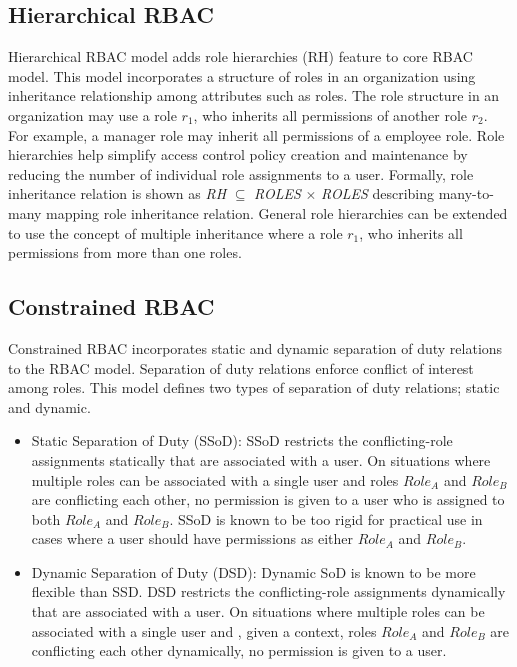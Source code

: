 \subsection{Hierarchical RBAC} 

Hierarchical RBAC model adds role hierarchies (RH) feature to core RBAC model.
This model incorporates a structure of roles in an organization using inheritance relationship among attributes such as roles.
The role structure in an organization may use
a role $r_1$, who inherits all permissions of another role $r_2$.
For example, a manager role may inherit all permissions of a employee role.
Role hierarchies help simplify access control policy creation and maintenance by reducing the number of
individual role assignments to a user. Formally, role inheritance relation is shown as \textit{RH} $\subseteq$ \textit{ROLES} $\times$ \textit{ROLES} describing many-to-many mapping role inheritance relation. 
General role hierarchies can be extended to use the concept of multiple inheritance where
a role $r_1$, who inherits all permissions from more than one roles.


\subsection{Constrained RBAC}

Constrained RBAC incorporates static and dynamic separation of duty relations to the RBAC model. Separation of 
duty relations enforce conflict of interest among roles. This model defines two types of separation of duty relations; static and dynamic.

\begin{itemize}
	\item Static Separation of Duty (SSoD): SSoD restricts the conflicting-role assignments statically that are associated with a user. On situations
	where multiple roles can be associated with a single user and roles $Role_A$ and $Role_B$ are conflicting each other, no permission is given to a user who is assigned to both $Role_A$ and $Role_B$. SSoD is known to be too rigid for practical use in cases where a user should have permissions as either $Role_A$ and $Role_B$.
	\item Dynamic Separation of Duty (DSD): Dynamic SoD is known to be
more flexible than SSD. DSD restricts the conflicting-role assignments dynamically that are associated with a user. On situations
	where multiple roles can be associated with a single user and , given a context, roles $Role_A$ and $Role_B$ are conflicting each other dynamically, no permission is given to a user.	
\end{itemize}
